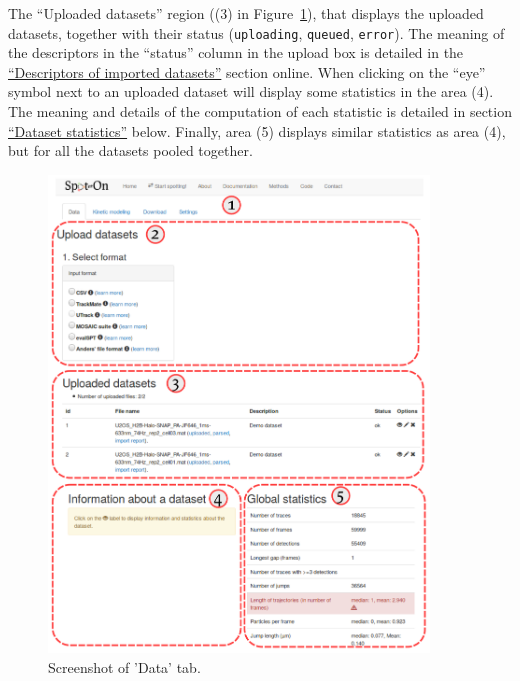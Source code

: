 
The ``Uploaded datasets'' region ((3) in Figure~\ref{fig:tuto2}), that displays the uploaded datasets, together with their status (\texttt{uploading}, \texttt{queued}, \texttt{error}). The meaning of the descriptors in the ``status'' column in the upload box is detailed in the \href{https://spoton.berkeley.edu/SPTGUI/docs/latest#import-codes}{``Descriptors of imported datasets''} section online. When clicking on the ``eye'' symbol next to an uploaded dataset will display some statistics in the area (4). The meaning and details of the computation of each statistic is detailed in section \href{https://spoton.berkeley.edu/SPTGUI/docs/latest#dataset-statistics}{``Dataset statistics''} below. Finally, area (5) displays similar statistics as area (4), but for all the datasets pooled together.

\begin{figure}[H]
\centering
\includegraphics[width=0.9\textwidth]{../SPTGUI/static/SPTGUI/img/tutorial/0.7/tuto2.png}
\caption{\label{fig:tuto2}Screenshot of 'Data' tab.}
\end{figure}


